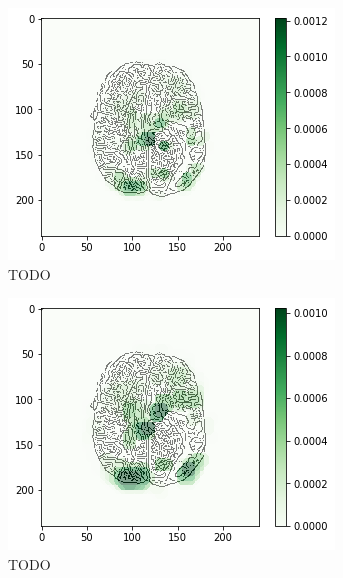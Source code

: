 \begin{figure}[H]
    \centering
    \begin{subfigure}{.33\textwidth}
        \centering
        \includegraphics[width=\linewidth]{chapters/06_hdm/b_Brats18_TCIA08_242_1_L2/39.png}
        \caption{TODO}
    \end{subfigure}%
    \begin{subfigure}{.33\textwidth}
        \centering
        \includegraphics[width=\linewidth]{chapters/06_hdm/circle15/19.png}
        \caption{TODO}
    \end{subfigure}
        \begin{subfigure}{.33\textwidth}
        \centering

\end{subfigure}
\end{figure}
